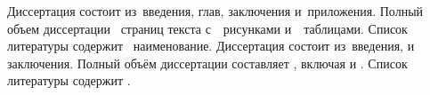 \ifsynopsis
{\volumeAndStructure} Диссертация состоит из~введения,
 глав, заключения и~приложения. Полный объем диссертации
~страниц текста с~~рисунками и~~таблицами. Список
литературы содержит ~наименование.
\else
{\volumeAndStructure} Диссертация состоит из~введения,
и заключения. %
%
Полный объём диссертации составляет
, включая
 и
.
Список литературы содержит
.
\fi

